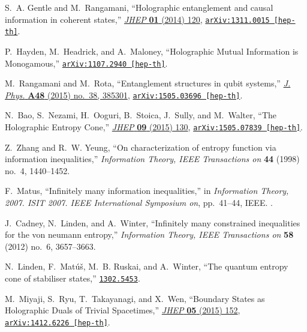 \begin{thebibliography}{100}
S.~A. Gentle and M.~Rangamani, ``{Holographic entanglement and causal
  information in coherent states},''
  \href{http://dx.doi.org/10.1007/JHEP01(2014)120}{{\em JHEP} {\bf 01} (2014)
  120},
\href{http://arxiv.org/abs/1311.0015}{{\tt arXiv:1311.0015 [hep-th]}}.

P.~Hayden, M.~Headrick, and A.~Maloney, ``{Holographic Mutual Information is
  Monogamous},''
\href{http://arxiv.org/abs/1107.2940}{{\tt arXiv:1107.2940 [hep-th]}}.

M.~Rangamani and M.~Rota, ``{Entanglement structures in qubit systems},''
  \href{http://dx.doi.org/10.1088/1751-8113/48/38/385301}{{\em J. Phys.} {\bf
  A48} (2015) no.~38, 385301},
\href{http://arxiv.org/abs/1505.03696}{{\tt arXiv:1505.03696 [hep-th]}}.

N.~Bao, S.~Nezami, H.~Ooguri, B.~Stoica, J.~Sully, and M.~Walter, ``{The
  Holographic Entropy Cone},''
  \href{http://dx.doi.org/10.1007/JHEP09(2015)130}{{\em JHEP} {\bf 09} (2015)
  130},
\href{http://arxiv.org/abs/1505.07839}{{\tt arXiv:1505.07839 [hep-th]}}.

Z.~Zhang and R.~W. Yeung, ``On characterization of entropy function via
  information inequalities,'' {\em Information Theory, IEEE Transactions on}
  {\bf 44} (1998) no.~4, 1440--1452.

F.~Matus, ``Infinitely many information inequalities,'' in {\em Information
  Theory, 2007. ISIT 2007. IEEE International Symposium on}, pp.~41--44, IEEE.
.

J.~Cadney, N.~Linden, and A.~Winter, ``Infinitely many constrained inequalities
  for the von neumann entropy,'' {\em Information Theory, IEEE Transactions on}
  {\bf 58} (2012) no.~6, 3657--3663.

N.~Linden, F.~Mat{\'u}{\v{s}}, M.~B. Ruskai, and A.~Winter, ``The quantum
  entropy cone of stabiliser states,''
  \href{http://arxiv.org/abs/1302.5453}{{\tt 1302.5453}}.

M.~Miyaji, S.~Ryu, T.~Takayanagi, and X.~Wen, ``{Boundary States as Holographic
  Duals of Trivial Spacetimes},''
  \href{http://dx.doi.org/10.1007/JHEP05(2015)152}{{\em JHEP} {\bf 05} (2015)
  152},
\href{http://arxiv.org/abs/1412.6226}{{\tt arXiv:1412.6226 [hep-th]}}.


\end{thebibliography}
